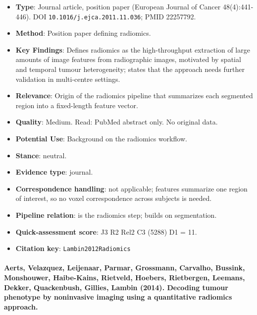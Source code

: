 \documentclass[journal,onecolumn]{IEEEtran}
\begin{document}
\begin{itemize}

\item{} \textbf{Type}: Journal article, position paper (European Journal of Cancer 48(4):441-446). DOI \nolinkurl{10.1016/j.ejca.2011.11.036}; PMID 22257792.

\item{} \textbf{Method}: Position paper defining radiomics.

\item{} \textbf{Key Findings}: Defines radiomics as the high-throughput extraction of large amounts of image features from radiographic images, motivated by spatial and temporal tumour heterogeneity; states that the approach needs further validation in multi-centre settings.

\item{} \textbf{Relevance}: Origin of the radiomics pipeline that summarizes each segmented region into a fixed-length feature vector.

\item{} \textbf{Quality}: Medium. Read: PubMed abstract only. No original data.

\item{} \textbf{Potential Use}: Background on the radiomics workflow.

\item{} \textbf{Stance}: neutral.

\item{} \textbf{Evidence type}: journal.

\item{} \textbf{Correspondence handling}: not applicable; features summarize one region of interest, so no voxel correspondence across subjects is needed.

\item{} \textbf{Pipeline relation}: is the radiomics step; builds on segmentation.

\item{} \textbf{Quick-assessment score}: J3 R2 Rel2 C3 (5288) D1 = 11.

\item{} \textbf{Citation key}: \texttt{Lambin2012Radiomics}

\end{itemize}

\paragraph{Aerts, Velazquez, Leijenaar, Parmar, Grossmann, Carvalho, Bussink, Monshouwer, Haibe-Kains, Rietveld, Hoebers, Rietbergen, Leemans, Dekker, Quackenbush, Gillies, Lambin (2014). Decoding tumour phenotype by noninvasive imaging using a quantitative radiomics approach.~\cite{Aerts2014Decoding}}\mbox{}
\end{document}
